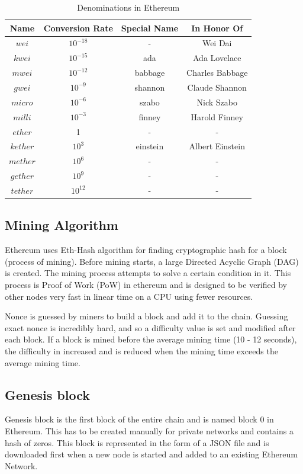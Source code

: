 \documentclass[11pt,openright]{report}
\begin{document}
\begin{table}[!htbp]
	\renewcommand{\arraystretch}{1.3}
	\caption{Denominations in Ethereum}
	\label{eth_denominations}
	\centering
	\begin{tabular}{|c||c|c|c|}
		\hline
		\bfseries Name & \bfseries Conversion Rate & \bfseries Special Name & \bfseries In Honor Of\\
		\hline\hline
		$wei$ & $10^{-18}$ & - & Wei Dai \\ \hline
	    $kwei$ & $10^{-15}$ & ada & Ada Lovelace \\ \hline
	    $mwei$ & $10^{-12}$ & babbage & Charles Babbage \\ \hline
	    $gwei$ & $10^{-9}$ & shannon & Claude Shannon \\ \hline
	    $micro$ & $10^{-6}$ & szabo & Nick Szabo \\ \hline
	    $milli$ & $10^{-3}$ & finney & Harold Finney \\ \hline
	    $ether$ & 1 & - & - \\ \hline
	    $kether$ & $10^{3}$ & einstein & Albert Einstein \\ \hline
	    $mether$ & $10^{6}$ & - & - \\ \hline
	    $gether$ & $10^{9}$ & - & - \\ \hline
	    $tether$ & $10^{12}$ & - & - \\ \hline
	\end{tabular}
\end{table}

\subsection{Mining Algorithm}
Ethereum uses Eth-Hash algorithm \cite{wood2014yellow} for finding cryptographic hash for a block (process of mining). Before mining starts, a large Directed Acyclic Graph (DAG) is created. The mining process attempts to solve a certain condition in it. This process is Proof of Work (PoW) in ethereum and is designed to be verified by other nodes very fast in linear time on a CPU using fewer resources.

Nonce is guessed by miners to build a block and add it to the chain. Guessing exact nonce is incredibly hard, and so a difficulty value is set and modified after each block. If a block is mined before the average mining time (10 - 12 seconds), the difficulty in increased and is reduced when the mining time exceeds the average mining time.

\subsection{Genesis block}
Genesis block is the first block of the entire chain and is named block 0 in Ethereum. This has to be created manually for private networks and contains a hash of zeros. This block is represented in the form of a JSON file and is downloaded first when a new node is started and added to an existing Ethereum Network.
\end{document}
